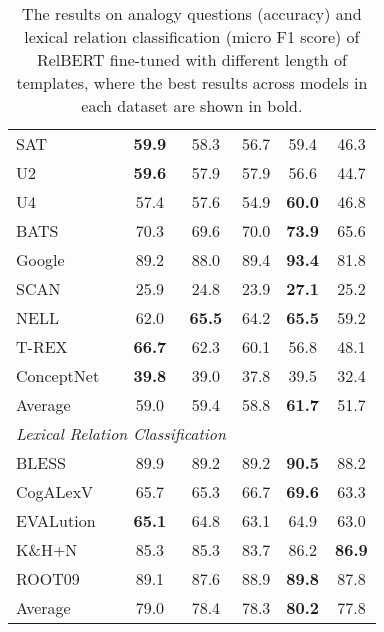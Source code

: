\documentclass[3p]{elsarticle}
\begin{document}
{\begin{table}[!t]
\begin{tabular}{lccccc}
SAT        & \textbf{59.9} & 58.3          & 56.7 & 59.4          & 46.3          \\
U2         & \textbf{59.6} & 57.9          & 57.9 & 56.6          & 44.7          \\
U4         & 57.4          & 57.6          & 54.9 & \textbf{60.0} & 46.8          \\
BATS       & 70.3          & 69.6          & 70.0 & \textbf{73.9} & 65.6          \\
Google     & 89.2          & 88.0          & 89.4 & \textbf{93.4} & 81.8          \\
SCAN       & 25.9          & 24.8          & 23.9 & \textbf{27.1} & 25.2          \\
NELL       & 62.0          & \textbf{65.5} & 64.2 & \textbf{65.5} & 59.2          \\
T-REX      & \textbf{66.7} & 62.3          & 60.1 & 56.8          & 48.1          \\
ConceptNet & \textbf{39.8} & 39.0          & 37.8 & 39.5          & 32.4          \\
\midrule
Average    & 59.0          & 59.4          & 58.8 & \textbf{61.7} & 51.7          \\
\midrule
\multicolumn{3}{l}{\textit{Lexical Relation Classification}} \\
BLESS      & 89.9          & 89.2          & 89.2 & \textbf{90.5} & 88.2          \\
CogALexV   & 65.7          & 65.3          & 66.7 & \textbf{69.6} & 63.3          \\
EVALution  & \textbf{65.1} & 64.8          & 63.1 & 64.9          & 63.0          \\
K\&H+N      & 85.3          & 85.3          & 83.7 & 86.2          & \textbf{86.9} \\
ROOT09     & 89.1          & 87.6          & 88.9 & \textbf{89.8} & 87.8          \\
\midrule
Average    & 79.0          & 78.4          & 78.3 & \textbf{80.2} & 77.8          \\
\bottomrule
\end{tabular}
\caption{The results on analogy questions (accuracy) and lexical relation classification (micro F1 score) of RelBERT fine-tuned with different length of templates, where the best results across models in each dataset are shown in bold.}
\label{tab:relbert:prompt-length}
\end{table}

}
\end{document}
